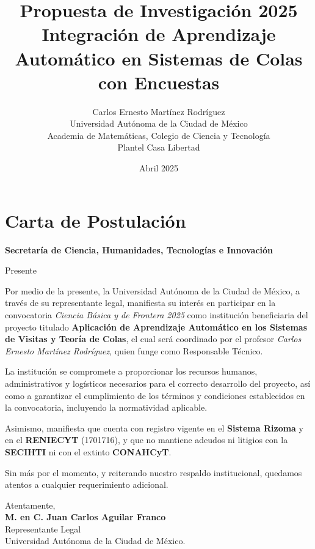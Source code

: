 \documentclass[12pt]{article}
\title{Propuesta de Investigación 2025\\Integración de Aprendizaje Automático en Sistemas de Colas con Encuestas}
\author{Carlos Ernesto Mart\'inez Rodr\'iguez\\Universidad Autónoma de la Ciudad de México\\
Academia de Matem\'aticas, Colegio de Ciencia y Tecnolog\'ia\\
Plantel Casa Libertad}
\date{Abril 2025}
\begin{document}
\maketitle
\tableofcontents
\newpage
\section{Carta de Postulación}
\newpage

\noindent\textbf{Secretaría de Ciencia, Humanidades, Tecnologías e Innovación}

\noindent Presente

\vspace{1cm}

\noindent Por medio de la presente, la Universidad Autónoma de la Ciudad de México, a través de su representante legal, manifiesta su interés en participar en la convocatoria \textit{Ciencia Básica y de Frontera 2025} como institución beneficiaria del proyecto titulado \textbf{Aplicaci\'on de Aprendizaje Automático en los Sistemas de Visitas y Teor\'ia de Colas}, el cual será coordinado por el profesor \textit{Carlos Ernesto Martínez Rodríguez}, quien funge como Responsable Técnico.
\medskip

\noindent La institución se compromete a proporcionar los recursos humanos, administrativos y logísticos necesarios para el correcto desarrollo del proyecto, así como a garantizar el cumplimiento de los términos y condiciones establecidos en la convocatoria, incluyendo la normatividad aplicable.

\medskip

\noindent Asimismo, manifiesta que cuenta con registro vigente en el \textbf{Sistema Rizoma} y en el \textbf{RENIECYT} (1701716), y que no mantiene adeudos ni litigios con la \textbf{SECIHTI} ni con el extinto \textbf{CONAHCyT}.

\medskip

\noindent Sin más por el momento, y reiterando nuestro respaldo institucional, quedamos atentos a cualquier requerimiento adicional.


\medskip



\vspace{1cm}
\noindent Atentamente,\\[0.3cm]
\textbf{M. en C. Juan Carlos Aguilar Franco}\\
Representante Legal\\
Universidad Autónoma de la Ciudad de México.\\
\end{document}
